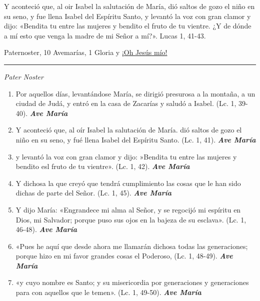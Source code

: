 \documentclass[a4paper,11pt, oneside]{report}
\begin{document}
{{    Y aconteció que, al oir Isabel la salutación de María, dió saltos de gozo el niño en su seno, y fue llena Isabel del Espíritu Santo, y levantó la voz con gran
    clamor y dijo: «Bendita tu entre las mujeres y bendito el fruto de tu vientre. ¿Y de dónde a mí esto que venga la madre de mi Señor a mí?». 
    Lucas 1, 41-43.
    
     Paternoster, 10 Avemarías, 1 Gloria y \hyperlink{finalVisitacion}{¡Oh Jesús mío!}

    \medskip

    \begin{center}\rule{1\linewidth}{\linethickness}\end{center}

    \medskip
    \textit{Pater Noster} 

    \begin{enumerate}
      \item Por aquellos días, levantándose María, se dirigió presurosa a la montaña, a un ciudad de Judá, y entró en la casa
      de Zacarías y saludó a Isabel. (Lc. 1, 39-40). \textbf{\textit{Ave María}}

      \item Y aconteció que, al oír Isabel la salutación de María. dió saltos de gozo el niño en su seno, y fué llena Isabel del Espíritu Santo. (Lc. 1, 41). \textbf{\textit{Ave María}}

      \item y levantó la voz con gran clamor y dijo: »Bendita tu entre las mujeres y bendito esl fruto de tu vientre». (Lc. 1, 42). \textbf{\textit{Ave María}}

      \item Y dichosa la que creyó que tendrá cumplimiento las cosas que le han sido dichas de parte del Señor. (Lc. 1, 45). \textbf{\textit{Ave María}}

      \item Y dijo María: «Engrandece mi alma al Señor, y se regocijó mi espíritu en Dios, mi Salvador;
      porque puso sus ojos en la bajeza de su esclava». (Lc. 1, 46-48). \textbf{\textit{Ave María}}

      \item «Pues he aquí que desde ahora me llamarán dichosa todas las generaciones; 
      porque hizo en mi favor grandes cosas el Poderoso, (Lc. 1, 48-49). \textbf{\textit{Ave María}}

      \item «y cuyo nombre es Santo; y su misericordia por generaciones y generaciones para con aquellos que le temen». (Lc. 1, 49-50). \textbf{\textit{Ave María}}


\end{enumerate}}}
\end{document}
